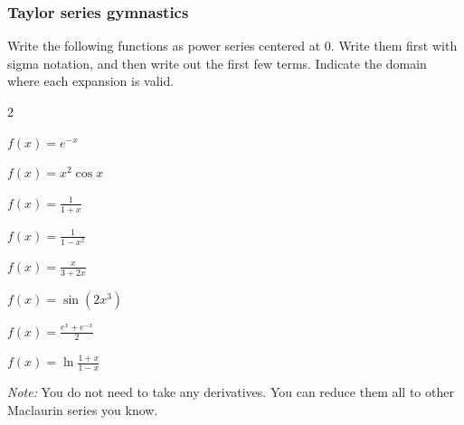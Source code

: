 \begin{frame}[t]
	\fontsize{13}{13}\selectfont
	\frametitle{Taylor series gymnastics}

	Write the following functions as power series centered at $0$. Write them
	first with sigma notation, and then write out the first few terms. Indicate
	the domain where each expansion is valid.

	\begin{enumerate}
	\end{enumerate}
	\vspace{.2cm}

	\emph{Note:} You do not need to take any derivatives. You can reduce them all to
	other Maclaurin series you know.
\end{frame}

